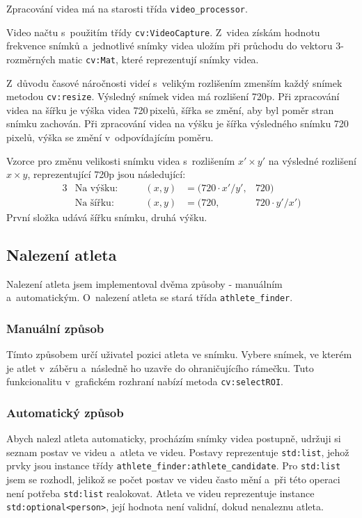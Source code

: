 Zpracování videa má na starosti třída \texttt{video\_processor}. 

Video načtu s~použitím třídy \texttt{cv\::VideoCapture}. Z~videa získám hodnotu frekvence snímků a~jednotlivé snímky videa uložím při průchodu do vektoru $3$-rozměrných matic \texttt{cv\::Mat}, které reprezentují snímky videa.

Z~důvodu časové náročnosti videí s~velikým rozlišením zmenším každý snímek metodou \texttt{cv\::resize}. Výsledný snímek videa má rozlišení 720p. Při zpracování videa na šířku je výška videa 720\,\rm pixelů, šířka se změní, aby byl poměr stran snímku zachován. Při zpracování videa na výšku je šířka výsledného snímku 720\,\rm pixelů, výška se změní v~odpovídajícím poměru.

Vzorce pro změnu velikosti snímku videa s~rozlišením $x'\times y'$ na výsledné rozlišení $x\times y$, reprezentující 720p jsou následující:
\begin{alignat*}{3}
    &\text{Na výšku:}   &\qquad (x, y) &= (720 \cdot x' / y',   &720) \\
    &\text{Na šířku:}   &\qquad (x, y) &= (720,                 &720 \cdot y' / x')
\end{alignat*}
První složka udává šířku snímku, druhá výšku.



\subsection{Nalezení atleta}

Nalezení atleta jsem implementoval dvěma způsoby - manuálním a~automatickým. O~nalezení atleta se stará třída \texttt{athlete\_finder}.

\subsubsection{Manuální způsob}

Tímto způsobem určí uživatel pozici atleta ve snímku. Vybere snímek, ve kterém je atlet v~záběru a~následně ho uzavře do ohraničujícího rámečku. Tuto funkcionalitu v~grafickém rozhraní nabízí metoda \texttt{cv\::selectROI}.


\subsubsection{Automatický způsob}

Abych nalezl atleta automaticky, procházím snímky videa postupně, udržuji si seznam postav ve videu a~atleta ve videu. Postavy reprezentuje \texttt{std\::list}, jehož prvky jsou instance třídy \texttt{athlete\_finder\::athlete\_candidate}. Pro \texttt{std\::list} jsem se rozhodl, jelikož se počet postav ve videu často mění a~při této operaci není potřeba \texttt{std\::list} realokovat. Atleta ve videu reprezentuje instance \texttt{std\::optional<person>}, její hodnota není validní, dokud nenaleznu atleta.

